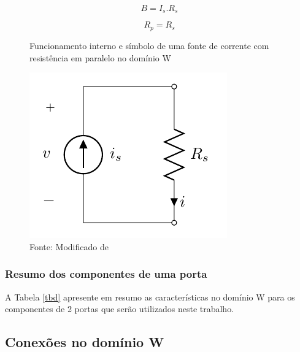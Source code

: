 	\begin{equation}
		\label{eqFundWdfCompFontCorr3}
		B = I_s.R_s
	\end{equation}
	
	\begin{equation}
		\label{eqFundWdfCompFontCorr4}
		R_p = R_s
	\end{equation}
	
	\begin{figure}[h]
		\label{figFundWdfCompFontCorr2}
		\caption{Funcionamento interno e símbolo de uma fonte de corrente com resistência em paralelo no domínio W}
		\includegraphics[scale=0.5]{images/fonteCorrenteModelada}
		\centering
		\caption*{Fonte: Modificado de \cite{Bogason2017}}
	\end{figure}
	
	
		\subsubsection{Resumo dos componentes de uma porta}
	A Tabela \ref{tbd} apresente em resumo as características no domínio W para os componentes de 2 portas que serão utilizados neste trabalho.
	
	
	\subsection{Conexões no domínio W}
	\label{secFundWdfComp}
	
